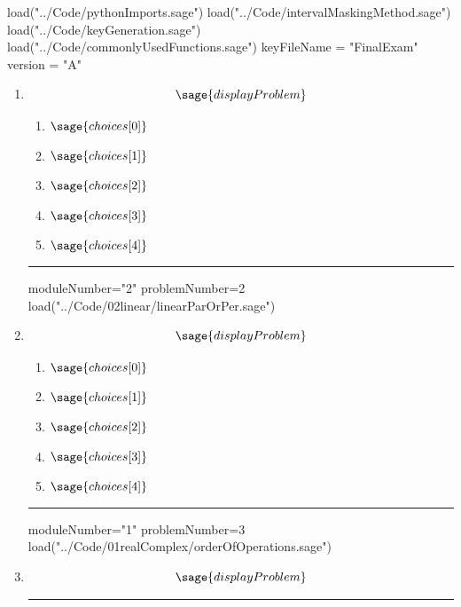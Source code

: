 \documentclass[14pt]{extbook}
\newcommand{\litem}[1]{\item#1\hspace*{-1cm}\rule{\textwidth}{0.4pt}}
\begin{document}
\pagestyle{fancy}

\begin{sagesilent}
load("../Code/pythonImports.sage")
load("../Code/intervalMaskingMethod.sage")
load("../Code/keyGeneration.sage")
load("../Code/commonlyUsedFunctions.sage")
keyFileName = "FinalExam"
version = "A"
\end{sagesilent}

\begin{enumerate}

\begin{sagesilent}
moduleNumber="1"
problemNumber=1
load("../Code/01realComplex/divideComplex.sage")
\end{sagesilent}

\litem{ 

   \[ \sage{displayProblem} \]

  	\begin{enumerate}[label=\Alph*.]
    \item \( \sage{choices[0]} \)
    \item \( \sage{choices[1]} \)
    \item \( \sage{choices[2]} \)
    \item \( \sage{choices[3]} \)
    \item \( \sage{choices[4]} \)
  	\end{enumerate}
  }
\begin{sagesilent}
moduleNumber="2"
problemNumber=2
load("../Code/02linear/linearParOrPer.sage")
\end{sagesilent}

\litem{ 

   \[ \sage{displayProblem} \]

  	\begin{enumerate}[label=\Alph*.]
    \item \( \sage{choices[0]} \)
    \item \( \sage{choices[1]} \)
    \item \( \sage{choices[2]} \)
    \item \( \sage{choices[3]} \)
    \item \( \sage{choices[4]} \)
  	\end{enumerate}
  }
\begin{sagesilent}
moduleNumber="1"
problemNumber=3
load("../Code/01realComplex/orderOfOperations.sage")
\end{sagesilent}

\litem{ 

   \[ \sage{displayProblem} \]

}
\end{enumerate}
\end{document}
